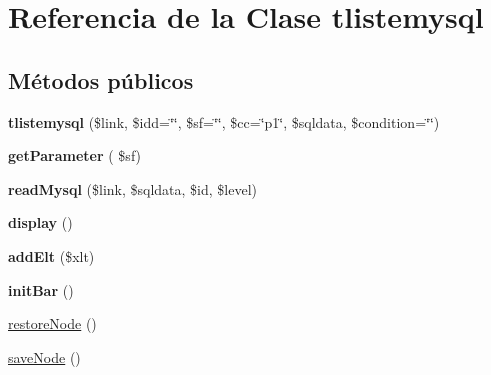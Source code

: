 \hypertarget{classtlistemysql}{}\section{Referencia de la Clase tlistemysql}
\label{classtlistemysql}
\subsection*{Métodos públicos}
\begin{DoxyCompactItemize}
\item 
\mbox{\label{classtlistemysql_a8367757eb09538a76e6e758e44204f33}} 
{\bfseries tlistemysql} (\$link, \$idd=\char`\"{}\char`\"{}, \$sf=\char`\"{}\char`\"{}, \$cc=\char`\"{}p1\char`\"{}, \$sqldata, \$condition=\char`\"{}\char`\"{})
\item 
\mbox{\label{classtlistemysql_a1185431d70945ccb10a170ec21a99076}} 
{\bfseries get\+Parameter} ( \$sf)
\item 
\mbox{\label{classtlistemysql_ae993b79fb3efc50cf76f206bb0be194a}} 
{\bfseries read\+Mysql} (\$link, \$sqldata, \$id, \$level)
\item 
\mbox{\label{classtlistemysql_a7007fb0857176648aeee18c73f059867}} 
{\bfseries display} ()
\item 
\mbox{\label{classtlistemysql_a1b00bffbd371386616d7ac066fb72d96}} 
{\bfseries add\+Elt} (\$xlt)
\item 
\mbox{\label{classtlistemysql_accab70872d4dec1339c56cee4d9aebf4}} 
{\bfseries init\+Bar} ()
\item 
\hyperlink{classtlistemysql_a90b5cddbe5cda56f32fee824f6d345ba}{restore\+Node} ()
\item 
\hyperlink{classtlistemysql_a43c24fd4e27b46f3ac409d1a8a16623b}{save\+Node} ()
\end{DoxyCompactItemize}
